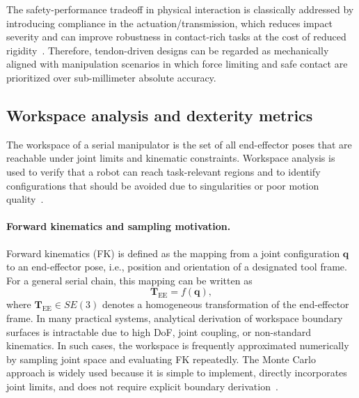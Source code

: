 The safety-performance tradeoff in physical interaction is classically addressed by introducing compliance in the actuation/transmission, which reduces impact severity and can improve robustness in contact-rich tasks at the cost of reduced rigidity~\cite{Bicchi2004FastSoftArm}. Therefore, tendon-driven designs can be regarded as mechanically aligned with manipulation scenarios in which force limiting and safe contact are prioritized over sub-millimeter absolute accuracy.


\subsection{Workspace analysis and dexterity metrics}
\label{sec:workspace_analysis_sampling_metrics}

The workspace of a serial manipulator is the set of all end-effector poses that are reachable under joint limits and kinematic constraints. Workspace analysis is used to verify that a robot can reach task-relevant regions and to identify configurations that should be avoided due to singularities or poor motion quality~\cite{Rastegar1990WorkspaceMonteCarlo,Dong2013WorkspaceDensity}.

\paragraph{Forward kinematics and sampling motivation.}
Forward kinematics (\ac{FK}) is defined as the mapping from a joint configuration $\mathbf{q}$ to an end-effector pose, i.e., position and orientation of a designated tool frame. For a general serial chain, this mapping can be written as
\begin{equation}
\mathbf{T}_{\mathrm{EE}} = f(\mathbf{q}),
\label{eq:fk_mapping}
\end{equation}
where $\mathbf{T}_{\mathrm{EE}} \in SE(3)$ denotes a homogeneous transformation of the end-effector frame. In many practical systems, analytical derivation of workspace boundary surfaces is intractable due to high \ac{DoF}, joint coupling, or non-standard kinematics. In such cases, the workspace is frequently approximated numerically by sampling joint space and evaluating \ac{FK} repeatedly. The Monte Carlo approach is widely used because it is simple to implement, directly incorporates joint limits, and does not require explicit boundary derivation~\cite{Rastegar1990WorkspaceMonteCarlo}.

